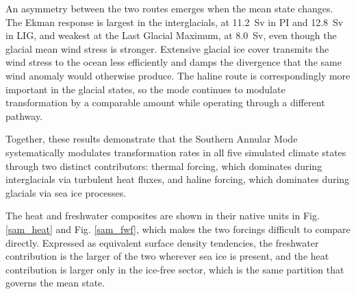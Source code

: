\documentclass[pdflatex,sn-nature]{sn-jnl}
\begin{document}
An asymmetry between the two routes emerges when the mean state changes. The Ekman response is largest in the interglacials, at 11.2~Sv in PI and 12.8~Sv in LIG, and weakest at the Last Glacial Maximum, at 8.0~Sv, even though the glacial mean wind stress is stronger. Extensive glacial ice cover transmits the wind stress to the ocean less efficiently and damps the divergence that the same wind anomaly would otherwise produce. The haline route is correspondingly more important in the glacial states, so the mode continues to modulate transformation by a comparable amount while operating through a different pathway.

Together, these results demonstrate that the Southern Annular Mode systematically modulates transformation rates in all five simulated climate states through two distinct contributors: thermal forcing, which dominates during interglacials via turbulent heat fluxes, and haline forcing, which dominates during glacials via sea ice processes.

The heat and freshwater composites are shown in their native units in Fig. \ref{sam_heat} and Fig. \ref{sam_fwf}, which makes the two forcings difficult to compare directly. Expressed as equivalent surface density tendencies, the freshwater contribution is the larger of the two wherever sea ice is present, and the heat contribution is larger only in the ice-free sector, which is the same partition that governs the mean state.



\end{document}
